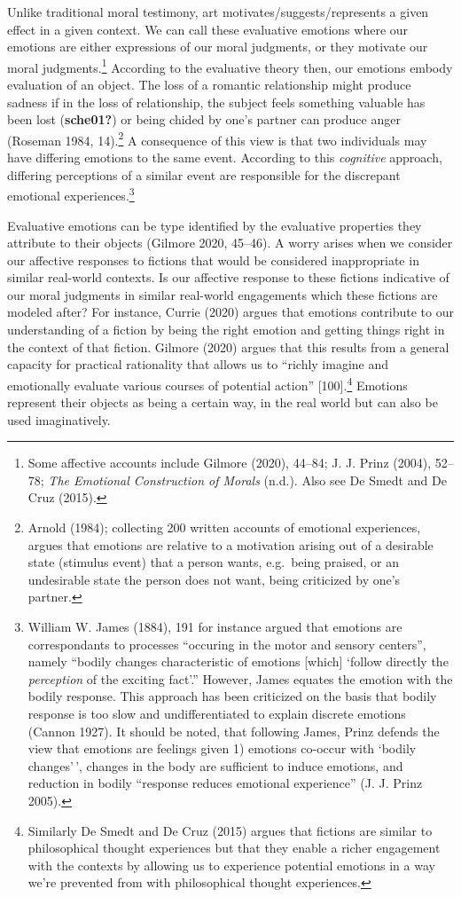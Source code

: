 \documentclass[12pt]{book}
\theoremstyle{definition}
\theoremstyle{remark}
\begin{document}
Unlike traditional moral testimony, art motivates/suggests/represents a given effect in a given context. We can call these evaluative emotions where our emotions are either expressions of our moral judgments, or they motivate our moral judgments.\footnote{Some affective accounts include Gilmore (2020), 44--84; J. J. Prinz (2004), 52--78; \emph{The {Emotional Construction} of {Morals}} (n.d.). Also see De Smedt and De Cruz (2015).} According to the evaluative theory then, our emotions embody evaluation of an object. The loss of a romantic relationship might produce sadness if in the loss of relationship, the subject feels something valuable has been lost (\textbf{sche01?}) or being chided by one's partner can produce anger (Roseman 1984, 14).\footnote{Arnold (1984); collecting 200 written accounts of emotional experiences, argues that emotions are relative to a motivation arising out of a desirable state (stimulus event) that a person wants, e.g.~being praised, or an undesirable state the person does not want, being criticized by one's partner.} A consequence of this view is that two individuals may have differing emotions to the same event. According to this \emph{cognitive} approach, differing perceptions of a similar event are responsible for the discrepant emotional experiences.\footnote{William W. James (1884), 191 for instance argued that emotions are correspondants to processes ``occuring in the motor and sensory centers'', namely ``bodily changes characteristic of emotions {[}which{]} `follow directly the \emph{perception} of the exciting fact'.'' However, James equates the emotion with the bodily response. This approach has been criticized on the basis that bodily response is too slow and undifferentiated to explain discrete emotions (Cannon 1927). It should be noted, that following James, Prinz defends the view that emotions are feelings given 1) emotions co-occur with `bodily changes'\,', changes in the body are sufficient to induce emotions, and reduction in bodily ``response reduces emotional experience'' (J. J. Prinz 2005).}

Evaluative emotions can be type identified by the evaluative properties they attribute to their objects (Gilmore 2020, 45--46). A worry arises when we consider our affective responses to fictions that would be considered inappropriate in similar real-world contexts. Is our affective response to these fictions indicative of our moral judgments in similar real-world engagements which these fictions are modeled after? For instance, Currie (2020) argues that emotions contribute to our understanding of a fiction by being the right emotion and getting things right in the context of that fiction. Gilmore (2020) argues that this results from a general capacity for practical rationality that allows us to ``richly imagine and emotionally evaluate various courses of potential action'' {[}100{]}.\footnote{Similarly De Smedt and De Cruz (2015) argues that fictions are similar to philosophical thought experiences but that they enable a richer engagement with the contexts by allowing us to experience potential emotions in a way we're prevented from with philosophical thought experiences.} Emotions represent their objects as being a certain way, in the real world but can also be used imaginatively.
\end{document}
